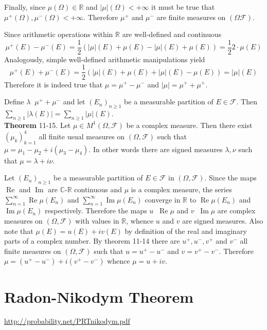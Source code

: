 \documentclass[a4paper]{article}
\newcommand{\brac}[1]{\left ( #1 \right )}
\newcommand{\abs}[1]{\left | #1 \right |}
\newcommand{\Real}{\mathbb{R}}
\newcommand{\Cplx}{\mathbb{C}}
\newcommand{\Fcal}{\mathcal{F}}
\newcommand{\defn}{\mathop{\overset{\Delta}{=}}\nolimits}
\newcommand{\re}{\operatorname{Re}\nolimits}
\newcommand{\im}{\operatorname{Im}\nolimits}
\begin{document}
Finally, since $\mu\brac{\Omega}\in \Real$ and $\abs{\mu}\brac{\Omega}<+\infty$ it must be true that $\mu^+\brac{\Omega},\mu^-\brac{\Omega}<+\infty$. Therefore $\mu^+$ and $\mu^-$ are finite measures on $\brac{\Omega \Fcal}$.

Since arithmetic operations within $\Real$ are well-defined and continuous \[\mu^+\brac{E} - \mu^-\brac{E} = \frac{1}{2}\brac{ \abs{\mu}\brac{E} + \mu\brac{E} - \abs{\mu}\brac{E} + \mu\brac{E} } = \frac{1}{2} 2 \cdot \mu\brac{E}\] Analogously, simple well-defined arithmetic manipulations yield \[ \mu^+\brac{E} + \mu^-\brac{E} = \frac{1}{2}\brac{ \abs{\mu}\brac{E} + \mu\brac{E} + \abs{\mu}\brac{E} - \mu\brac{E}} = \abs{\mu}\brac{E}\] Therefore it is indeed true that $\mu = \mu^+-\mu^-$ and $\abs{\mu} = \mu^++\mu^+$.

Define $\lambda \defn \mu^+ + \mu^-$ and let $\brac{E_n}_{n\geq 1}$ be a measurable partition of $E\in \Fcal$. Then $\sum_{n\geq1} \abs{\lambda\brac{E}} = \sum_{n\geq1} \abs{\mu}\brac{E}$.\\

\label{thm:complex_meas_decomp} \noindent \textbf{Theorem} 11-15.
Let $\mu\in M^1\brac{\Omega, \Fcal}$ be a complex measure. Then there exist $\brac{\mu_k}_{k=1}^4$ all finite usual measures on $\brac{\Omega, \Fcal}$ such that $\mu=\mu_1 - \mu_2 + i \brac{\mu_3 - \mu_4}$. In other words there are signed measures $\lambda, \nu$ such that $\mu=\lambda + i \nu$.

Let $\brac{E_n}_{n\geq1}$ be a measurable partition of $E\in \Fcal$ in $\brac{\Omega, \Fcal}$. Since the maps $\re$ and $\im$ are $\Cplx$-$\Real$ continuous and $\mu$ is a complex measure, the series $\sum_{n=1}^\infty \re \mu\brac{E_n}$ and $\sum_{n=1}^\infty \im \mu\brac{E_n}$ converge in $\Real$ to $\re \mu\brac{E_n}$ and $\im \mu\brac{E_n}$ respectively. Therefore the maps $u\defn \re \mu$ and $v\defn \im \mu$ are complex measures on $\brac{\Omega, \Fcal}$ with values in $\Real$, whence $u$ and $v$ are signed measures. Also note that $\mu\brac{E} = u\brac{E} + i v\brac{E}$ by definition of the real and imaginary parts of a complex number. By theorem 11-14 there are $u^+, u^-, v^+$ and $v^-$ all finite measures on $\brac{\Omega, \Fcal}$ such that $u=u^+-u^-$ and $v=v^+-v^-$. Therefore $\mu = \brac{u^+ - u^-} + i\brac{v^+ - v^-}$ whence $\mu = u + i v$.\\


\section{Radon-Nikodym Theorem} %
\label{sec:tut_12}
\url{http://probability.net/PRTnikodym.pdf}
\end{document}
